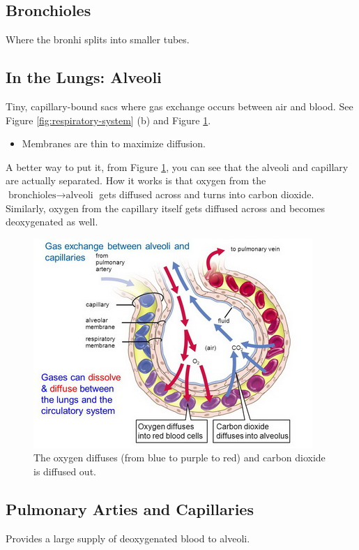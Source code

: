 \documentclass[12pt]{report}
\begin{document}
\subsection{Bronchioles}
\begin{definition}[Bronchioles]
    Where the bronhi splits into smaller tubes.
\end{definition}

\divider 

\subsection{In the Lungs: Alveoli}
\begin{definition}
    Tiny, capillary-bound sacs where gas exchange occurs between air and blood. See Figure \ref{fig:respiratory-system} (b) and Figure \ref{fig:alveoli}.
    \begin{itemize}
        \item{Membranes are thin to maximize diffusion.}
    \end{itemize}
    A better way to put it, from Figure \ref{fig:alveoli}, you can see that the alveoli and capillary are actually separated. How it works is that oxygen from the $ \text{bronchioles}\to \text{alveoli}$ gets diffused across and turns into carbon dioxide. Similarly, oxygen from the capillary itself gets diffused across and becomes deoxygenated as well.
\end{definition}

\begin{figure}[H]
\centering
    \includegraphics[width=0.7 \textwidth]{../figures/alveoli2.jpg}
    \caption{The oxygen diffuses (from blue to purple to red) and carbon dioxide is diffused out.}
    \label{fig:alveoli}
\end{figure}

\subsection{Pulmonary Arties and Capillaries}
\begin{definition}
    Provides a large supply of deoxygenated blood to alveoli.
\end{definition}
\end{document}
